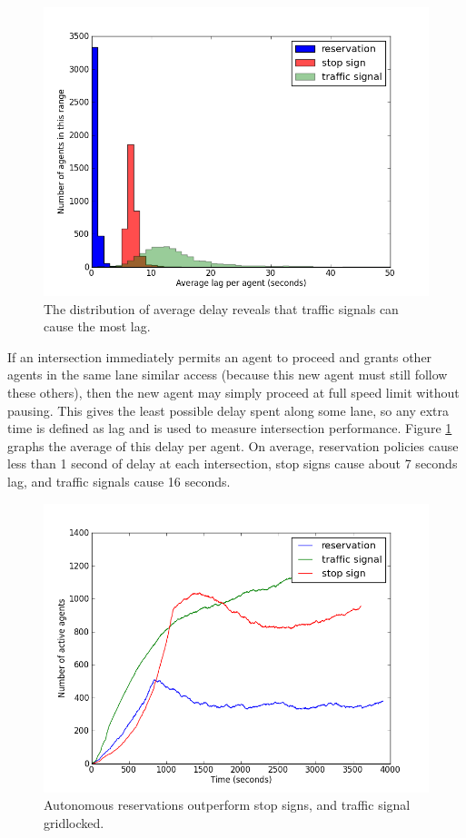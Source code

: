 \documentclass[letterpaper, 10 pt, conference]{ieeeconf}  %
\begin{document}
\begin{figure}[h]
  \centering \includegraphics[width=\linewidth]{avg_lag_agent_atx.png}
  \caption{The distribution of average delay reveals that traffic signals can
           cause the most lag.}
  \label{fig:avg_lag}
  \vspace{-10pt}
\end{figure}

If an intersection immediately permits an agent to proceed and grants other
agents in the same lane similar access (because this new agent must still follow
these others), then the new agent may simply proceed at full speed limit without
pausing. This gives the least possible delay spent along some lane, so any extra
time is defined as lag and is used to measure intersection performance. Figure
\ref{fig:avg_lag} graphs the average of this delay per agent. On average,
reservation policies cause less than 1 second of delay at each intersection,
stop signs cause about 7 seconds lag, and traffic signals cause 16 seconds.

\begin{figure}[h]
  \centering \includegraphics[width=\linewidth]{agent_cnt_atx.png}
  \caption{Autonomous reservations outperform stop signs, and traffic signal
           gridlocked.}
  \label{fig:agent_cnt}
  \vspace{-10pt}
\end{figure}
\end{document}
